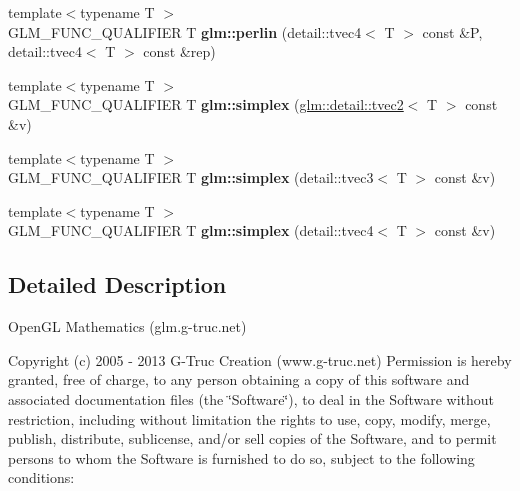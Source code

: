 \begin{DoxyCompactItemize}
\item 
\hypertarget{namespaceglm_a91e347e1dc525eacb73aa8264cd453d9}{}{\footnotesize template$<$typename T $>$ }\\G\+L\+M\+\_\+\+F\+U\+N\+C\+\_\+\+Q\+U\+A\+L\+I\+F\+I\+E\+R T {\bfseries glm\+::perlin} (detail\+::tvec4$<$ T $>$ const \&P, detail\+::tvec4$<$ T $>$ const \&rep)\label{namespaceglm_a91e347e1dc525eacb73aa8264cd453d9}

\item 
\hypertarget{namespaceglm_ac4117960bae18a7e9401bfe1dc7cc3b9}{}{\footnotesize template$<$typename T $>$ }\\G\+L\+M\+\_\+\+F\+U\+N\+C\+\_\+\+Q\+U\+A\+L\+I\+F\+I\+E\+R T {\bfseries glm\+::simplex} (\hyperlink{structglm_1_1detail_1_1tvec2}{glm\+::detail\+::tvec2}$<$ T $>$ const \&v)\label{namespaceglm_ac4117960bae18a7e9401bfe1dc7cc3b9}

\item 
\hypertarget{namespaceglm_a40d0ad04932c7d2ba3abdf216e6c9f93}{}{\footnotesize template$<$typename T $>$ }\\G\+L\+M\+\_\+\+F\+U\+N\+C\+\_\+\+Q\+U\+A\+L\+I\+F\+I\+E\+R T {\bfseries glm\+::simplex} (detail\+::tvec3$<$ T $>$ const \&v)\label{namespaceglm_a40d0ad04932c7d2ba3abdf216e6c9f93}

\item 
\hypertarget{namespaceglm_a3044f493ace43d71eaad6b49cd9f35a9}{}{\footnotesize template$<$typename T $>$ }\\G\+L\+M\+\_\+\+F\+U\+N\+C\+\_\+\+Q\+U\+A\+L\+I\+F\+I\+E\+R T {\bfseries glm\+::simplex} (detail\+::tvec4$<$ T $>$ const \&v)\label{namespaceglm_a3044f493ace43d71eaad6b49cd9f35a9}

\end{DoxyCompactItemize}


\subsection{Detailed Description}
Open\+G\+L Mathematics (glm.\+g-\/truc.\+net)

Copyright (c) 2005 -\/ 2013 G-\/\+Truc Creation (www.\+g-\/truc.\+net) Permission is hereby granted, free of charge, to any person obtaining a copy of this software and associated documentation files (the \char`\"{}\+Software\char`\"{}), to deal in the Software without restriction, including without limitation the rights to use, copy, modify, merge, publish, distribute, sublicense, and/or sell copies of the Software, and to permit persons to whom the Software is furnished to do so, subject to the following conditions\+:


